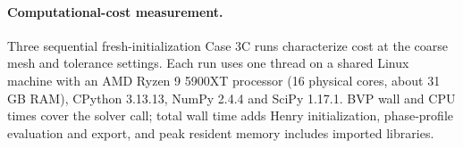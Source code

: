 \paragraph{Computational-cost measurement.}
Three sequential fresh-initialization Case 3C runs characterize cost at the coarse mesh and tolerance settings.
Each run uses one thread on a shared Linux machine with an AMD Ryzen 9 5900XT processor (16 physical cores, about 31 GB RAM), CPython 3.13.13, NumPy 2.4.4 and SciPy 1.17.1.
BVP wall and CPU times cover the solver call; total wall time adds Henry initialization, phase-profile evaluation and export, and peak resident memory includes imported libraries.
